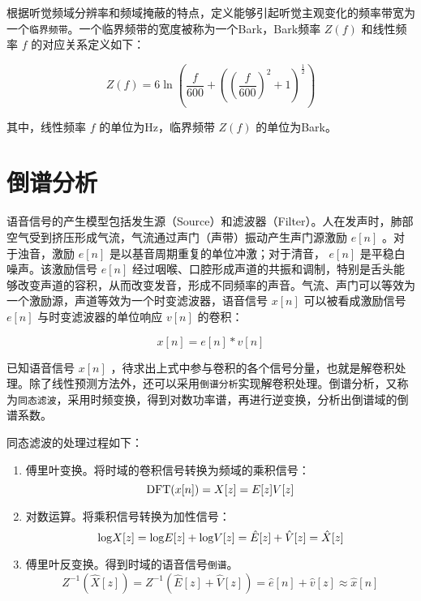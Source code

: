 \documentclass[cn,10pt,math=newtx,citestyle=gb7714-2015,bibstyle=gb7714-2015]{elegantbook}
\begin{document}
根据听觉频域分辨率和频域掩蔽的特点，定义能够引起听觉主观变化的频率带宽为一个\lstinline{临界频带}。一个临界频带的宽度被称为一个Bark，Bark频率 $Z(f)$ 和线性频率 $f$ 的对应关系定义如下：

\begin{equation}
  Z(f)=6\mathop{ln}(\frac{f}{600}+((\frac{f}{600})^2+1)^{\frac{1}{2}})
\end{equation}

其中，线性频率 $f$ 的单位为Hz，临界频带 $Z(f)$ 的单位为Bark。

\section{倒谱分析}

语音信号的产生模型包括发生源（Source）和滤波器（Filter）。人在发声时，肺部空气受到挤压形成气流，气流通过声门（声带）振动产生声门源激励 $e[n]$ 。对于浊音，激励 $e[n]$ 是以基音周期重复的单位冲激；对于清音， $e[n]$ 是平稳白噪声。该激励信号 $e[n]$ 经过咽喉、口腔形成声道的共振和调制，特别是舌头能够改变声道的容积，从而改变发音，形成不同频率的声音。气流、声门可以等效为一个激励源，声道等效为一个时变滤波器，语音信号 $x[n]$ 可以被看成激励信号 $e[n]$ 与时变滤波器的单位响应 $v[n]$ 的卷积：

\begin{equation}
  x[n]=e[n]*v[n]
\end{equation}

已知语音信号 $x[n]$ ，待求出上式中参与卷积的各个信号分量，也就是解卷积处理。除了线性预测方法外，还可以采用\lstinline{倒谱分析}实现解卷积处理。倒谱分析，又称为\lstinline{同态滤波}，采用时频变换，得到对数功率谱，再进行逆变换，分析出倒谱域的倒谱系数。

同态滤波的处理过程如下：

\begin{enumerate}
  \item 傅里叶变换。将时域的卷积信号转换为频域的乘积信号：
  \begin{equation}
    {\rm DFT}(x[n])=X[z]=E[z]V[z]
  \end{equation}
  \item 对数运算。将乘积信号转换为加性信号：
  \begin{equation}
    {\rm log} X[z]={\rm log}E[z]+{\rm log}V[z]=\hat{E}[z]+\hat{V}[z]=\hat{X}[z]
  \end{equation}
  \item 傅里叶反变换。得到时域的语音信号\lstinline{倒谱}。
  \begin{equation}
    Z^{-1}(\hat{X}[z])=Z^{-1}(\hat{E}[z]+\hat{V}[z])=\hat{e}[n]+\hat{v}[z]\approx \hat{x}[n]
  \end{equation}
\end{enumerate}
\end{document}
